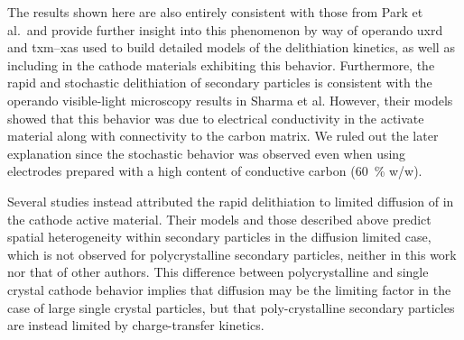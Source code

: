 
The results shown here are also entirely
consistent with those from Park et al.\ and provide further insight
into this phenomenon by way of operando \gls{uxrd} and \gls{txm}--\gls{xas} used to build detailed models of the delithiation kinetics,
as well as including \nca{} in the cathode materials exhibiting this behavior. Furthermore, the rapid and stochastic delithiation of secondary particles is consistent with the operando visible-light microscopy results in Sharma et al\cite{zhao2022}. However, their models showed that this behavior was due to electrical conductivity in the activate material along with connectivity to the carbon matrix. We ruled out the later explanation since the stochastic behavior was observed even when using electrodes prepared with a high content of conductive carbon (\SI{60}{\percent} w/w).

Several studies instead attributed the rapid delithiation to limited diffusion of  in the cathode active material\cite{rao2021, wang2020-6}. Their models and those
described above predict spatial
heterogeneity within secondary particles in the diffusion limited case\cite{wang2020-6}, which is
not observed for polycrystalline secondary particles, neither in this
work nor that of other authors\cite{chueh2021, zhao2022}. This difference between
polycrystalline and single crystal cathode behavior implies that
 diffusion may be the limiting factor in the case of large
single crystal particles, but that poly-crystalline secondary
particles are instead limited by charge-transfer kinetics.

